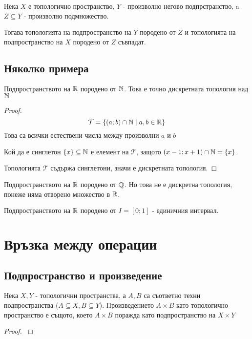 \begin{proposition}
    Нека $X$ е топологично пространство, $Y$ - произволно негово подпрстранство, a $Z \subseteq Y$ - произволно подмножество.

    Тогава топологията на подпространство на $Y$ породено от $Z$ и топологията на подпространство на $X$ породено от $Z$ съвпадат.
\end{proposition}

\subsection{Няколко примера}
\begin{example}
    Подпространството на ${\mathbb{R}}$ породено от ${\mathbb{N}}$. Това е точно дискретната топология над ${\mathbb{N}}$
\end{example}
\begin{proof}
    \begin{equation}
        \mathcal T = \left\{(a; b) \cap {\mathbb{N}} \mid a, b \in {\mathbb{R}}\right\}
    \end{equation}
    Това са всички естествени числа между произволни $a$ и $b$

    Кой да е синглетон $\{x\} \subseteq {\mathbb{N}}$ е елемент на $\mathcal T$, защото $(x-1;x+1) \cap {\mathbb{N}} = \{x\}$.

    Топологията $\mathcal T$ съдържа синглетони, значи е дискретната топология.
\end{proof}
\begin{example}
    Подпространството на ${\mathbb{R}}$ породено от ${\mathbb{Q}}$. Но това не е дискретна топология, понеже няма отворено множество в ${\mathbb{R}}$. 
\end{example}
\begin{example}
    Подпространството на ${\mathbb{R}}$ породено от $I = [0; 1]$ - единичния интервал.
\end{example}

\section{Връзка между операции}
\subsection{Подпространство и произведение}
\begin{theorem}
    Нека $X, Y$ - топологични пространства, а $A, B$ са съответно техни подпространства ($A \subseteq X, B \subseteq Y$). Произведението $A \times B$ като топологично пространство е същото, което $A \times B$ поражда като подпространство на $X \times Y$
\end{theorem}
\begin{proof}
    \cite[p.~87]{munkrestopology}
\end{proof}

